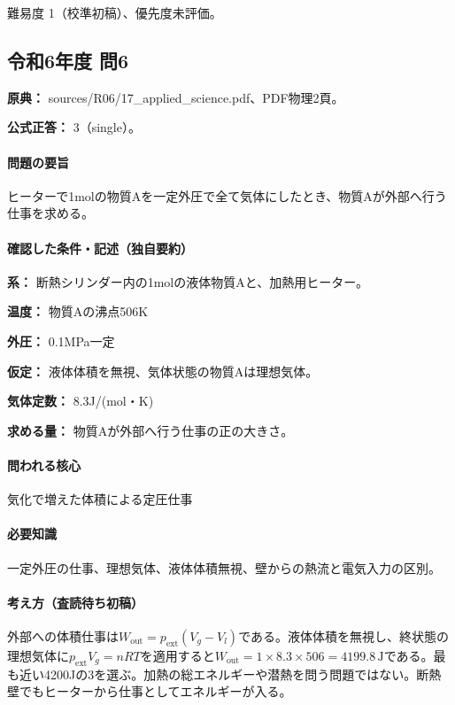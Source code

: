 \par 難易度 1（校準初稿）、優先度未評価。

\subsection{令和6年度 問6}
\label{q:r06-reg-applied-06}

\noindent\textbf{原典：} sources/R06/17\_applied\_science.pdf、PDF物理2頁。

\textbf{公式正答：} 3（single）。

\paragraph{問題の要旨} ヒーターで1molの物質Aを一定外圧で全て気体にしたとき、物質Aが外部へ行う仕事を求める。

\paragraph{確認した条件・記述（独自要約）}\mbox{}\par

\noindent\textbf{系：} 断熱シリンダー内の1molの液体物質Aと、加熱用ヒーター。\par

\noindent\textbf{温度：} 物質Aの沸点506K\par

\noindent\textbf{外圧：} 0.1MPa一定\par

\noindent\textbf{仮定：} 液体体積を無視、気体状態の物質Aは理想気体。\par

\noindent\textbf{気体定数：} 8.3J/(mol・K)\par

\noindent\textbf{求める量：} 物質Aが外部へ行う仕事の正の大きさ。\par

\paragraph{問われる核心} 気化で増えた体積による定圧仕事

\paragraph{必要知識} 一定外圧の仕事、理想気体、液体体積無視、壁からの熱流と電気入力の区別。

\paragraph{考え方（査読待ち初稿）} 外部への体積仕事は\(W_{\mathrm{out}}=p_{\mathrm{ext}}(V_g-V_l)\)である。液体体積を無視し、終状態の理想気体に\(p_{\mathrm{ext}}V_g=nRT\)を適用すると\(W_{\mathrm{out}}=1\times8.3\times506=4199.8\,\mathrm{J}\)である。最も近い4200Jの3を選ぶ。加熱の総エネルギーや潜熱を問う問題ではない。断熱壁でもヒーターから仕事としてエネルギーが入る。

